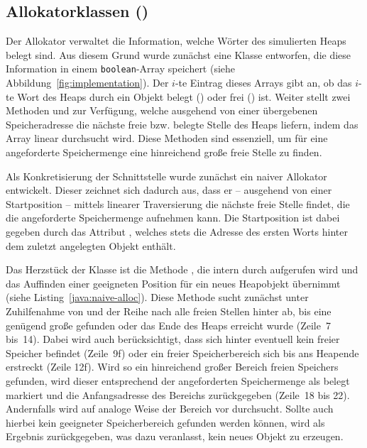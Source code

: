 \subsection{Allokatorklassen ()}
\label{sub:allocator}
Der Allokator verwaltet die Information, welche Wörter des simulierten Heaps belegt sind.
Aus diesem Grund wurde zunächst eine Klasse  entworfen, die diese Information in einem \texttt{boolean}-Array speichert (siehe Abbildung~\ref{fig:implementation}).
Der $i$-te Eintrag dieses Arrays gibt an, ob das $i$-te Wort des Heaps durch ein Objekt belegt () oder frei () ist.
Weiter stellt  zwei Methoden  und  zur Verfügung, welche ausgehend von einer übergebenen Speicheradresse die nächste freie bzw. belegte Stelle des Heaps liefern, indem das Array linear durchsucht wird.
Diese Methoden sind essenziell, um für eine angeforderte Speichermenge eine hinreichend große freie Stelle zu finden.

Als Konkretisierung der Schnittstelle  wurde zunächst ein naiver Allokator entwickelt.
Dieser zeichnet sich dadurch aus, dass er -- ausgehend von einer Startposition -- mittels linearer Traversierung die nächste freie Stelle findet, die die angeforderte Speichermenge aufnehmen kann.
Die Startposition ist dabei gegeben durch das Attribut , welches stets die Adresse des ersten Worts hinter dem zuletzt angelegten Objekt enthält.

Das Herzstück der Klasse  ist die Methode , die intern durch  aufgerufen wird und das Auffinden einer geeigneten Position für ein neues Heapobjekt übernimmt (siehe Listing~\ref{java:naive-alloc}).
Diese Methode sucht zunächst unter Zuhilfenahme von  und  der Reihe nach alle freien Stellen hinter  ab, bis eine genügend große gefunden oder das Ende des Heaps erreicht wurde (Zeile~7 bis~14).
Dabei wird auch berücksichtigt, dass sich hinter  eventuell kein freier Speicher befindet (Zeile~9f) oder ein freier Speicherbereich sich bis ans Heapende erstreckt (Zeile 12f).
Wird so ein hinreichend großer Bereich freien Speichers gefunden, wird dieser entsprechend der angeforderten Speichermenge als belegt markiert und die Anfangsadresse des Bereichs zurückgegeben (Zeile~18 bis 22).
Andernfalls wird auf analoge Weise der Bereich vor  durchsucht.
Sollte auch hierbei kein geeigneter Speicherbereich gefunden werden können, wird als Ergebnis  zurückgegeben, was  dazu veranlasst, kein neues Objekt zu erzeugen.

